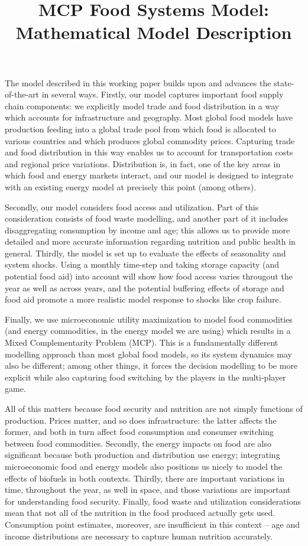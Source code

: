 \documentclass[letter,12pt]{article}
\begin{document}
\title{MCP Food Systems Model: Mathematical Model Description}
\author{}
\date{}

\maketitle

The model described in this working paper builds upon and advances the state-of-the-art in several ways.  Firstly, our model captures important food supply chain components: we explicitly model trade and food distribution in a way which accounts for infrastructure and geography.  Most global food models have production feeding into a global trade pool from which food is allocated to various countries and which produces global commodity prices.  Capturing trade and food distribution in this way enables us to account for transportation costs and regional price variations.  Distribution is, in fact, one of the key areas in which food and energy markets interact, and our model is designed to integrate with an existing energy model at precisely this point (among others).

Secondly, our model considers food access and utilization.  Part of this consideration consists of food waste modelling, and another part of it includes disaggregating consumption by income and age; this allows us to provide more detailed and more accurate information regarding nutrition and public health in general.  Thirdly, the model is set up to evaluate the effects of seasonality and system shocks.  Using a monthly time-step and taking storage capacity (and potential food aid) into account will show how food access varies througout the year as well as across years, and the potential buffering effects of storage and food aid promote a more realistic model response to shocks like crop failure.

Finally, we use microeconomic utility maximization to model food commodities (and energy commodities, in the energy model we are using) which results in a Mixed Complementarity Problem (MCP).  This is a fundamentally different modelling approach than most global food models, so its system dynamics may also be different; among other things, it forces the decision modelling to be more explicit while also capturing food switching by the players in the multi-player game.

All of this matters because food security and nutrition are not simply functions of production.  Prices matter, and so does infrastructure: the latter affects the former, and both in turn affect food consumption and consumer switching between food commodities.  Secondly, the energy impacts on food are also significant because both production and distribution use energy; integrating microeconomic food and energy models also positions us nicely to model the effects of biofuels in both contexts.  Thirdly, there are important variations in time, throughout the year, as well in space, and those variations are important for understanding food security.  Finally, food waste and utilization considerations mean that not all of the nutrition in the food produced actually gets used.  Consumption point estimates, moreover, are insufficient in this context -- age and income distributions are necessary to capture human nutrition accurately.
\end{document}
